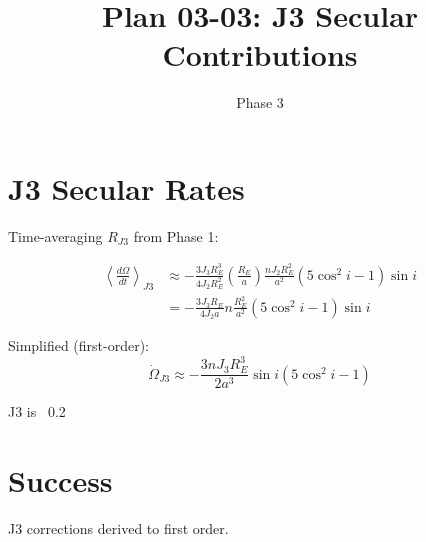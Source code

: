 \documentclass[11pt]{article}
\title{Plan 03-03: J3 Secular Contributions}
\date{Phase 3}
\begin{document}
\maketitle

\section{J3 Secular Rates}

Time-averaging $R_{J3}$ from Phase 1:

\begin{align}
\left\langle\frac{d\Omega}{dt}\right\rangle_{J3} &\approx -\frac{3 J_3 R_E^3}{4 J_2 R_E^2}\left(\frac{R_E}{a}\right)\frac{n J_2 R_E^2}{a^2}(5\cos^2 i - 1)\sin i\\
&= -\frac{3 J_3 R_E}{4 J_2 a}n \frac{R_E^2}{a^2}(5\cos^2 i - 1)\sin i
\end{align}

Simplified (first-order):
\begin{equation}
\boxed{\dot{\Omega}_{J3} \approx -\frac{3 n J_3 R_E^3}{2 a^3}\sin i(5\cos^2 i - 1)}
\end{equation}

J3 is ~0.2%

\section{Success}
J3 corrections derived to first order.
\end{document}
